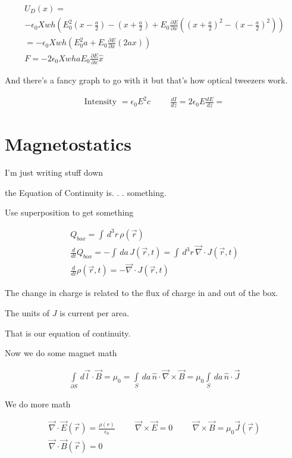 \documentclass[fleqn]{report}
\newcommand{\hp}{\hspace{1cm}}
\newcommand{\del}{\partial}
\newcommand{\equations} [1] {
\begin{gather*}
#1
\end{gather*}
}
\begin{document}
\equations{
    U_D(x) 
    =
    \\
    - \epsilon_0 X wh 
    \left( 
        E_0^2 (x - \frac{a}{2}) - (x + \frac{a}{2})
        +
        E_0 \frac{\del E}{\del x}
        \left(
            (x + \frac{a}{2})^2 - (x - \frac{a}{2})^2
        \right)
    \right)
    \\
    =
    - \epsilon_0 X wh 
    \left( 
        E_0^2 a
        +
        E_0 \frac{\del E}{\del x}
        \left(
            2ax
        \right)
    \right)
    \\
    F = -2 \epsilon_0 X wh a E_0 \frac{\del E}{\del x} \hat x 
}

And there's a fancy graph to go with it but that's how optical tweezers 
work.   

\equations{
    \textrm{Intensity } 
    = 
    \epsilon_0 E^2 c
    \hp 
    \frac{d I}{dz} = 2 \epsilon_0  E \frac{dE}{dz}
    =
}

\chapter{Magnetostatics}
I'm just writing stuff down 

the Equation of Continuity is. . . something. 

Use superposition to get something 

\equations{
    Q_{box} = \int \, d^3 r \, \rho(\vec r)
    \\
    \frac{d}{dt} Q_{box}
    =
    -
    \int \, da \, 
    J(\vec r, t)
    =
    \int \, d^3 r \, 
    \vec \nabla 
    \cdot 
    J(\vec r, t)
    \\
    \frac{d}{dt} \rho(\vec r, t)
    =
    -
    \vec \nabla \cdot J(\vec r, t)
}

The change in charge is related to the flux of charge in and out of the box. 

The units of $J$ is current per area. 

That is our equation of continuity. 

Now we do some magnet math 

\equations{
    \int\limits_{\del S} \, d \vec l \cdot \vec B = \mu_0
    =
    \int\limits_S \, da \, \hat n \cdot \vec \nabla \times \vec B 
    =
    \mu_0 
    \int\limits_S \, da \, \hat n \cdot \vec J 
}

We do more math 

\equations{
    \vec \nabla \cdot \vec E(\vec r) = \frac{\rho(r)}{\epsilon_0}
    \hp
    \vec \nabla \times \vec E = 0 
    \hp
    \vec \nabla \times \vec B = \mu_0 \vec J(\vec r)
    \\
    \vec \nabla \cdot \vec B(\vec r) = 0
}
\end{document}
